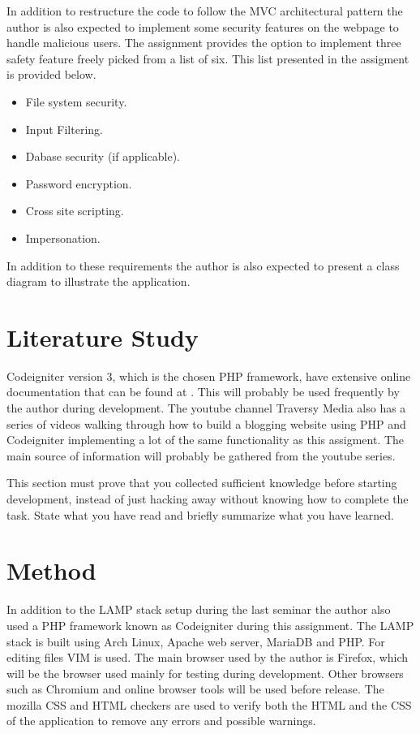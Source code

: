 \documentclass[a4paper]{scrartcl}
\begin{document}
In addition to restructure the code to follow the MVC architectural pattern the author is also expected to implement some security features on the webpage to handle malicious users. The assignment provides the option to implement three safety feature freely picked from a list of six. This list presented in the assigment is provided below.

\begin{itemize}
    \item File system security.
    \item Input Filtering.
    \item Dabase security (if applicable).
    \item Password encryption.
    \item Cross site scripting.
    \item Impersonation.
\end{itemize}

In addition to these requirements the author is also expected to present a class diagram to illustrate the application.

\section{Literature Study}
Codeigniter version 3, which is the chosen PHP framework, have extensive online documentation that can be found at \citet{noauthor_codeigniter_docs}. This will probably be used frequently by the author during development. The youtube channel Traversy Media also has a series of videos \citet{noauthor_youtube_nodate} walking through how to build a blogging website using PHP and Codeigniter implementing a lot of the same functionality as this assigment. The main source of information will probably be gathered from the youtube series.

This section must prove that you collected sufficient knowledge before starting development, instead of just hacking away without knowing how to complete the task. State what you have read and briefly summarize what you have learned.

\section{Method}

In addition to the LAMP stack setup during the last seminar the author also used a PHP framework known as Codeigniter \citet{noauthor_codeigniter_nodate} during this assignment. The LAMP stack is built using Arch Linux, Apache web server, MariaDB and PHP. For editing files VIM is used. The main browser used by the author is Firefox, which will be the browser used mainly for testing during development. Other browsers such as Chromium and online browser tools will be used before release. The mozilla CSS and HTML checkers are used to verify both the HTML and the CSS of the application to remove any errors and possible warnings.  
\end{document}
